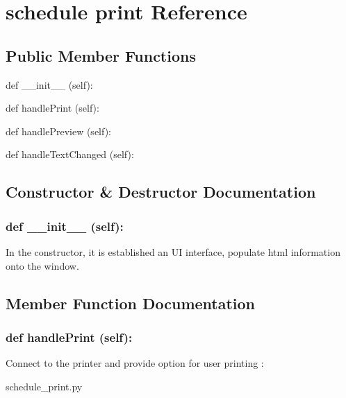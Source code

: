 \hypertarget{schedule_print}{\section{schedule print Reference}
\label{schedule_print}
}
\subsection*{Public Member Functions}
\begin{DoxyCompactItemize}
\item 
def {\_\_init\_\_} (self):
\item 
def {handlePrint} (self):
\item 
def {handlePreview} (self):
\item 
def {handleTextChanged} (self):

\end{DoxyCompactItemize}

\subsection{Constructor \& Destructor Documentation}
\hypertarget{class_poly_aa3def076b74bed67904976ad4f9fe9b1}{
\subsubsection[{def __init__ (self):}]{\setlength{\rightskip}{0pt plus 5cm}def {\_\_init\_\_} (self): 
}}
In the constructor, it is established an UI interface, populate html information onto the window. 

\subsection{Member Function Documentation}
\hypertarget{class_poly_a14a7ad77ce612b0c54f531d307ee4b39}{
\subsubsection[{def handlePrint (self):}]{\setlength{\rightskip}{0pt plus 5cm}def {handlePrint} (self):}}\label{class_poly_a14a7ad77ce612b0c54f531d307ee4b39}
Connect to the printer and provide option for user printing
:\begin{DoxyCompactItemize}
\item 
schedule\_print.\-py\end{DoxyCompactItemize}

